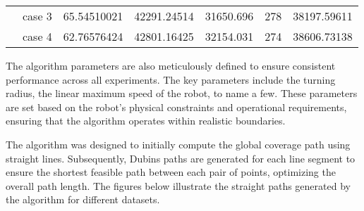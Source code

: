 \begin{table}[]
\begin{tabular}{cllllll}
    \rowcolor[HTML]{FFFFC7} 
    \cellcolor[HTML]{FFFFC7}                                                                                               & case 3                  & 65.54510021                                                                            & 42291.24514                                                                               & 31650.696                                                                           & 278                                                                        & 38197.59611                                                                                \\ \cline{2-7} 
    \rowcolor[HTML]{FFFFC7} 
    \multirow{-4}{*}{\cellcolor[HTML]{FFFFC7}10000}                                                                        & case 4                  & 62.76576424                                                                            & 42801.16425                                                                               & 32154.031                                                                           & 274                                                                        & 38606.73138                                                                                \\ \hline
    \end{tabular}
    \end{table}


\vspace*{6mm}  






The algorithm parameters are also meticulously defined to ensure consistent performance across all experiments. The key parameters include the turning radius, the linear maximum speed of the robot, to name a few. These parameters are set based on the robot's physical constraints and operational requirements, ensuring that the algorithm operates within realistic boundaries.

\vspace*{6mm}

The algorithm was designed to initially compute the global coverage path using straight lines. Subsequently, Dubins paths are generated for each line segment to ensure the shortest feasible path between each pair of points, optimizing the overall path length. The figures below illustrate the straight paths generated by the algorithm for different datasets.



